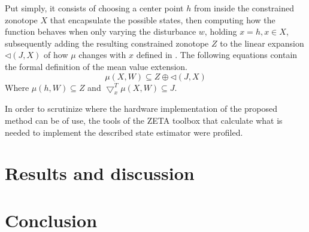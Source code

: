 \documentclass[conference]{IEEEtran}
\begin{document}
Put simply, it consists of choosing a center point $h$ from inside the constrained zonotope $X$ that encapsulate the possible states, then computing how the function behaves when only varying the disturbance $w$, holding $x=h, x \in X$, subsequently adding the resulting constrained zonotope $Z$ to the linear expansion $\lhd(J, X)$ of how $\mu$ changes with $x$ defined in \cite{REGO2020108614}. The following equations contain the formal definition of the mean value extension.
\begin{equation}
    \mu(X,W) \subseteq Z \oplus \lhd(J, X)
\end{equation}
Where $\mu(h, W) \subseteq Z$ and $\bigtriangledown_x^T\mu(X,W) \subseteq J$.


In order to scrutinize where the hardware implementation of the proposed method can be of use, the tools of the ZETA toolbox \cite{Rego2025ZETA} that calculate what is needed to implement the described state estimator were profiled.



\section{Results and discussion}

\section{Conclusion}


\end{document}
